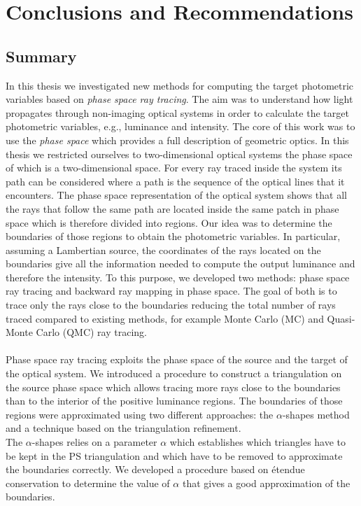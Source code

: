 \chapter{Conclusions and Recommendations}\label{chap:conclusions}
\section{Summary}
In this thesis we investigated new methods for computing the target photometric variables based on \textit{phase space ray tracing}. The aim was to understand how light propagates through non-imaging optical systems in order to calculate the target photometric variables, e.g., luminance and intensity. 
The core of this work was to use the \textit{phase space} which provides a full description of geometric optics. In this thesis we restricted ourselves to two-dimensional optical systems the phase space of which is a two-dimensional space. For every ray traced inside the system its path can be considered where a path is the sequence of the optical lines that it encounters. The phase space representation of the optical system shows that all the rays that follow the same path are located inside the same patch in phase space which is therefore divided into regions. Our idea was to determine the boundaries of those regions to obtain the photometric variables. In particular, assuming a Lambertian source, the coordinates of the rays located on the boundaries give all the information needed to compute the output luminance and therefore the intensity.
To this purpose, we developed two methods: phase space ray tracing and backward ray mapping in phase space. The goal of both is to trace only the rays close to the boundaries reducing the total number of rays traced compared to existing methods, for example Monte Carlo (MC) and Quasi-Monte Carlo (QMC) ray tracing.
\\ \\ \indent Phase space ray tracing exploits the phase space of the source and the target of the optical system. %
We introduced a procedure to construct a triangulation on the source phase space which allows tracing more rays close to the boundaries than to the interior of the positive luminance regions. 
The boundaries of those regions were approximated using two different approaches: the $\alpha$-shapes method and a technique based on the triangulation refinement. \\ \indent 
The $\alpha$-shapes relies on a parameter $\alpha$ which establishes which triangles have to be kept in the PS triangulation and which have to be removed to approximate the boundaries correctly. We developed a procedure based on \'{e}tendue conservation to determine the value of $\alpha$ that gives a good approximation of the boundaries.
